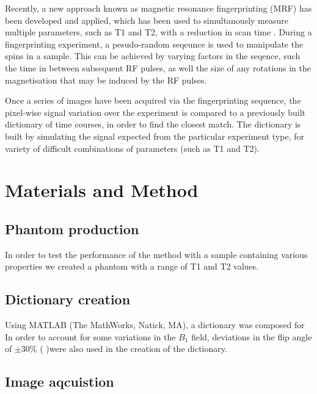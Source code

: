 \documentclass[3p, twocolumn]{elsarticle}
\begin{document}
Recently, a new approach known as magnetic resonance fingerprinting (MRF) has been developed and applied, which has been used to simultanously measure multiple parameters, such as T1 and T2, with a reduction in scan time \cite{ma2013magnetic} . During a fingerprinting experiment, a pesudo-random seqeunce is used to manipulate the spins in a sample. This can be achieved by varying factors in the seqence, such the time in between subsequent RF pulses, as well the size of any rotations in the magnetisation that may be induced by the RF pulses.

Once a series of images have been acquired via the fingerprinting sequence, the pixel-wise signal variation over the experiment is compared to a previously built dictionary of time courses, in order to find the closest match. The dictionary is built by simulating the signal expected from the particular experiment type, for variety of difficult combinations of parameters (such as T1 and T2). 


\section{Materials and Method}


\subsection{Phantom production}
In order to test the performance of the method with a sample containing various properties we created a phantom with a range of T1 and T2 values. %

\subsection{Dictionary creation}
Using MATLAB (The
MathWorks, Natick, MA), a dictionary was composed for %
In order to account for some variations in the $B_1$ field,  deviations in the flip angle of $\pm$30\% (%
)were also used in the creation of the dictionary.



\subsection{Image aqcuistion}
\end{document}
